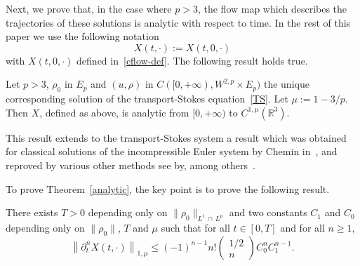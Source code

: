 \documentclass[AHL,Unicode,longabstracts,published]{cedram}
\newcommand{\R}{\mathbb{R}}
\renewcommand{\leq}{\leqslant}
\renewcommand{\geq}{\geqslant}
\begin{document}
Next, we prove that, in the case where $p>3$, the flow map which describes the trajectories of these solutions is analytic with respect to time. In the rest of this paper we use the following notation
\[
X(t,\cdot):=X(t,0,\cdot)
\]
with $X(t,0,\cdot)$ defined in~\eqref{cflow-def}. The following result holds true.
\begin{theo}\label{analytic}
Let $p>3$, $\rho_0$ in $E_p$ and $ (u,\rho)$ in $C([0,+\infty),W^{2,p} \times E_p)$ the unique corresponding solution of the transport-Stokes equation~\eqref{TS}. Let $\mu:=1-3/p$. Then $ X$, defined as above, is analytic from $[0,+\infty)$ to $ C^{1,\mu}(\R^3)$.
\end{theo} This result extends to the transport-Stokes system a result which was obtained for classical solutions of the incompressible Euler system by Chemin in~\cite{Chemin}, and reproved by various other methods see by, among others~\cite{CVW,FZ,Gamblin,ogfstt,Inci,Kato,
Serfati,Shnirelman}.


To prove Theorem~\ref{analytic}, the key point is to prove the following result.

\begin{prop}\label{apana}
There exists $T>0$ depending only on $\|\rho_0\|_{L^1\, \cap\, L^p}$ and two constants $C_1 $ and $C_0$ depending only on $\|\rho_0\|$, $T$ and $\mu$ such that for all $t\in[0,T]$ and for all $n\geq1$,
\begin{equation}\label{rec_formule}
\left\|\partial_t^{n} X(t,\cdot)\right\|_{1,\mu} \leq (-1)^{n-1} n!
\begin{pmatrix}
1/2 \\ n
\end{pmatrix}
C_0^n C_1^{n-1}.
\end{equation}
\end{prop}
\end{document}
